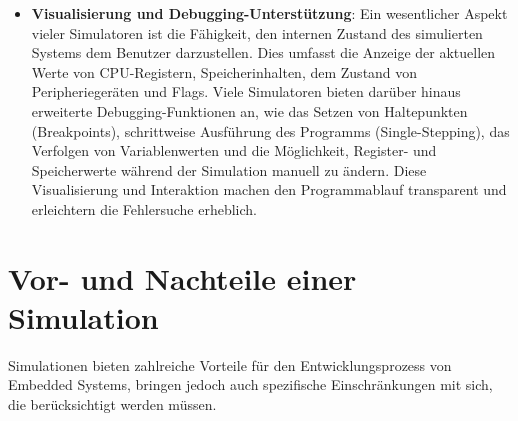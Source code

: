 \begin{itemize}
    \item \textbf{Visualisierung und Debugging-Unterstützung}: Ein wesentlicher Aspekt vieler Simulatoren ist die Fähigkeit, den internen Zustand des simulierten Systems dem Benutzer darzustellen. Dies umfasst die Anzeige der aktuellen Werte von CPU-Registern, Speicherinhalten, dem Zustand von Peripheriegeräten und Flags. Viele Simulatoren bieten darüber hinaus erweiterte Debugging-Funktionen an, wie das Setzen von Haltepunkten (Breakpoints), schrittweise Ausführung des Programms (Single-Stepping), das Verfolgen von Variablenwerten und die Möglichkeit, Register- und Speicherwerte während der Simulation manuell zu ändern. Diese Visualisierung und Interaktion machen den Programmablauf transparent und erleichtern die Fehlersuche erheblich.
\end{itemize}

\section{Vor- und Nachteile einer Simulation}

Simulationen bieten zahlreiche Vorteile für den Entwicklungsprozess von Embedded Systems, bringen jedoch auch spezifische Einschränkungen mit sich, die berücksichtigt werden müssen.

